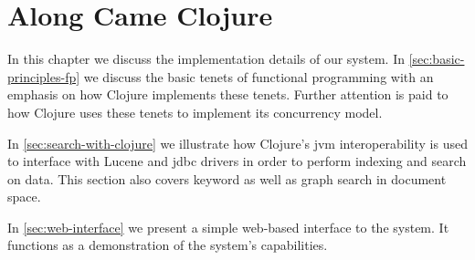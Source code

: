 \chapter{Along Came Clojure}
\label{chap:along-came-clojure}
	In this chapter we discuss the implementation details of our system.  In \cref{sec:basic-principles-fp} we discuss the basic tenets of functional programming with an emphasis on how Clojure implements these tenets.  Further attention is paid to how Clojure uses these tenets to implement its concurrency model.
	
	In \cref{sec:search-with-clojure} we illustrate how Clojure's \gls{jvm} interoperability is used to interface with Lucene and \gls{jdbc} drivers in order to perform indexing and search on data.  This section also covers keyword as well as graph search in document space.
	
	In \cref{sec:web-interface} we present a simple web-based interface to the system.  It functions as a demonstration of the system's capabilities.
	
	
	
	